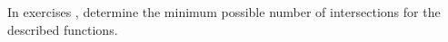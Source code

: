 {\noindent In exercises}
{, determine the minimum possible number of intersections for the described functions.}
